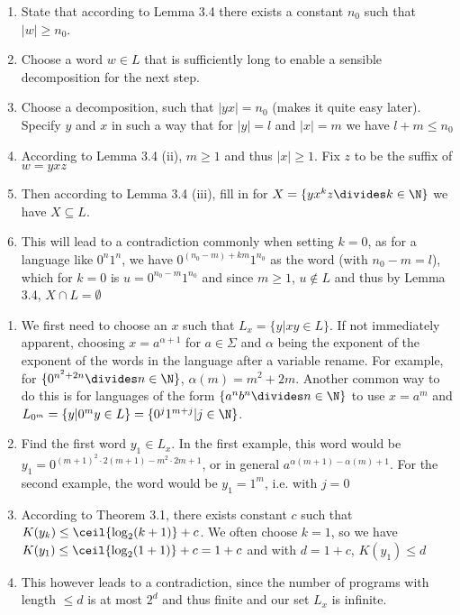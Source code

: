 \begin{enumerate}[noitemsep]
    \item State that according to Lemma 3.4 there exists a constant $n_0$ such that $|w| \geq n_0$.
    \item Choose a word $w \in L$ that is sufficiently long to enable a sensible decomposition for the next step.
    \item Choose a decomposition, such that $|yx| = n_0$ (makes it quite easy later). Specify $y$ and $x$ in such a way that for $|y| = l$ and $|x| = m$ we have $l + m \leq n_0$
    \item According to Lemma 3.4 (ii), $m \geq 1$ and thus $|x| \geq 1$. Fix $z$ to be the suffix of $w = yxz$
    \item Then according to Lemma 3.4 (iii), fill in for $X = \{ yx^k z \divides k \in \N \}$ we have $X \subseteq L$.
    \item This will lead to a contradiction commonly when setting $k = 0$, as for a language like $0^n1^n$, we have $0^{(n_0 - m) + km}1^{n_0}$ as the word (with $n_0 - m = l$),
          which for $k = 0$ is $u= 0^{n_0 - m} 1^{n_0}$ and since $m \geq 1$, $u \notin L$ and thus by Lemma 3.4, $X \cap L = \emptyset$
\end{enumerate}


\begin{enumerate}[noitemsep]
    \item We first need to choose an $x$ such that $L_x = \{ y | xy \in L \}$.
          If not immediately apparent, choosing $x = a^{\alpha + 1}$ for $a \in \Sigma$
          and $\alpha$ being the exponent of the exponent of the words in the language after a variable rename.
          For example, for $\{ 0^{n^2 + 2n} \divides n \in \N \}$, $\alpha(m) = m^2 + 2m$.
          Another common way to do this is for languages of the form $\{ a^n b^n \divides n \in \N \}$ to use $x = a^m$ and
          $L_{0^m} = \{ y | 0^m y \in L \} = \{ 0^j 1^{m + j} | j \in \N \}$.
    \item Find the first word $y_1 \in L_x$. In the first example, this word would be $y_1 = 0^{(m + 1)^2 \cdot 2(m + 1) - m^2 \cdot 2m + 1}$,
          or in general $a^{\alpha(m + 1) - \alpha(m) + 1}$.
          For the second example, the word would be $y_1 = 1^m$, i.e. with $j = 0$
    \item According to Theorem 3.1, there exists constant $c$ such that $K(y_k) \leq \ceil{\log_2(k + 1)} + c$. We often choose $k = 1$,
          so we have $K(y_1) \leq \ceil{\log_2(1 + 1)} + c = 1 + c$ and with $d = 1 + c$, $K(y_1) \leq d$
    \item This however leads to a contradiction, since the number of programs with length $\leq d$ is at most $2^d$ and thus finite and our set $L_x$ is infinite.
\end{enumerate}


